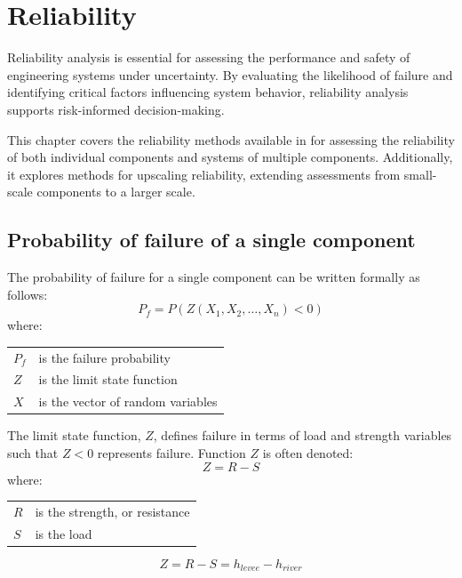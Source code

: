 \chapter{Reliability}
\label{chp:Reliability}

Reliability analysis is essential for assessing the performance and safety of engineering systems under uncertainty. By evaluating the likelihood of failure and identifying critical factors influencing system behavior, reliability analysis supports risk-informed decision-making.

This chapter covers the reliability methods available in \probLib for assessing the reliability of both individual components and systems of multiple components. Additionally, it explores methods for upscaling reliability, extending assessments from small-scale components to a larger scale.

\section{Probability of failure of a single component}\label{Section_2.2.2}
The probability of failure for a single component can be written formally as follows:
\begin{equation}
P_{f} = P(Z(X_1, X_2, \dots, X_n)<0) \label{eq:2-1}
\end{equation}
where:

\begin{tabular}{p{0.2in}p{2.3in}}  
$P_{f} $ & is the failure probability \\  
$Z$ & is the limit state function \\  
$X$ & is the vector of random variables \\  
\end{tabular}

The limit state function, $Z$, defines failure in terms of load and strength variables such that $Z<0$ represents failure. Function $Z$ is often denoted:
\begin{equation}
Z=R-S\label{eq:2-2}
\end{equation}
where:

\begin{tabular}{p{0.1in}p{2.1in}}  
$R$ & is the strength, or resistance \\  
$S$ & is the load \\  
\end{tabular}

\begin{equation} 
Z=R-S=h_{levee} -h_{river}\label{eq:2-3} 
\end{equation}

